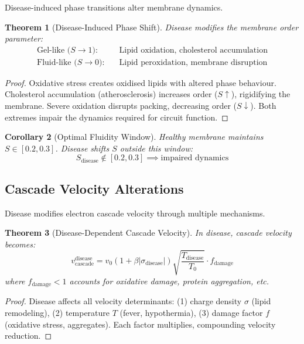 \documentclass[11pt,twocolumn,a4paper]{article}
\newtheorem{theorem}{Theorem}[section]
\newtheorem{corollary}[theorem]{Corollary}
\theoremstyle{definition}
\theoremstyle{remark}
\begin{document}
Disease-induced phase transitions alter membrane dynamics.

\begin{theorem}[Disease-Induced Phase Shift]
\label{thm:disease_phase_shift}
Disease modifies the membrane order parameter:
\begin{align}
\text{Gel-like (} S \to 1 \text{):} &\quad \text{Lipid oxidation, cholesterol accumulation} \\
\text{Fluid-like (} S \to 0 \text{):} &\quad \text{Lipid peroxidation, membrane disruption}
\end{align}
\end{theorem}

\begin{proof}
Oxidative stress creates oxidised lipids with altered phase behaviour. Cholesterol accumulation (atherosclerosis) increases order ($S \uparrow$), rigidifying the membrane. Severe oxidation disrupts packing, decreasing order ($S \downarrow$). Both extremes impair the dynamics required for circuit function.
\end{proof}

\begin{corollary}[Optimal Fluidity Window]
\label{cor:optimal_fluidity}
Healthy membrane maintains $S \in [0.2, 0.3]$. Disease shifts $S$ outside this window:
\begin{equation}
S_{\text{disease}} \notin [0.2, 0.3] \implies \text{impaired dynamics}
\end{equation}
\end{corollary}

\subsection{Cascade Velocity Alterations}

Disease modifies electron cascade velocity through multiple mechanisms.

\begin{theorem}[Disease-Dependent Cascade Velocity]
\label{thm:disease_cascade_velocity}
In disease, cascade velocity becomes:
\begin{equation}
v_{\text{cascade}}^{\text{disease}} = v_0 \left(1 + \beta |\sigma_{\text{disease}}|\right) \sqrt{\frac{T_{\text{disease}}}{T_0}} \cdot f_{\text{damage}}
\end{equation}
where $f_{\text{damage}} < 1$ accounts for oxidative damage, protein aggregation, etc.
\end{theorem}

\begin{proof}
Disease affects all velocity determinants: (1) charge density $\sigma$ (lipid remodeling), (2) temperature $T$ (fever, hypothermia), (3) damage factor $f$ (oxidative stress, aggregates). Each factor multiplies, compounding velocity reduction.
\end{proof}
\end{document}
